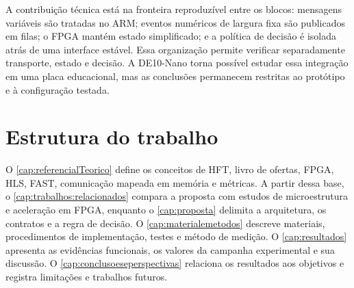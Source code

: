 A contribuição técnica está na fronteira reproduzível entre os blocos: mensagens variáveis são tratadas no ARM; eventos numéricos de largura fixa são publicados em filas; o FPGA mantém estado simplificado; e a política de decisão é isolada atrás de uma interface estável. Essa organização permite verificar separadamente transporte, estado e decisão. A DE10-Nano torna possível estudar essa integração em uma placa educacional, mas as conclusões permanecem restritas ao protótipo e à configuração testada.

\section{Estrutura do trabalho}\label{sec:estruturaTrabalho}

O \autoref{cap:referencialTeorico} define os conceitos de HFT, livro de ofertas, FPGA, HLS, FAST, comunicação mapeada em memória e métricas. A partir dessa base, o \autoref{cap:trabalhos:relacionados} compara a proposta com estudos de microestrutura e aceleração em FPGA, enquanto o \autoref{cap:proposta} delimita a arquitetura, os contratos e a regra de decisão. O \autoref{cap:materialemetodos} descreve materiais, procedimentos de implementação, testes e método de medição. O \autoref{cap:resultados} apresenta as evidências funcionais, os valores da campanha experimental e sua discussão. O \autoref{cap:conclusoeseperspectivas} relaciona os resultados aos objetivos e registra limitações e trabalhos futuros.
